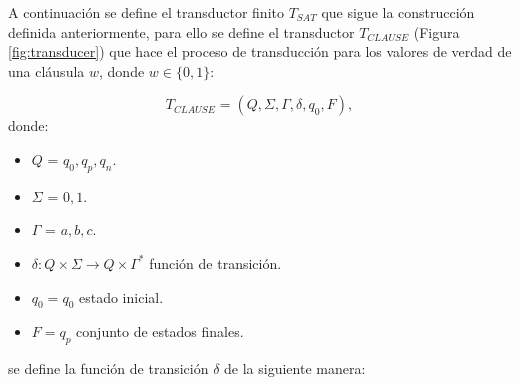\documentclass[12pt]{article}
\begin{document}
A continuación se define el transductor finito $T_{SAT}$ que sigue la construcción definida anteriormente, para ello se define
el transductor $T_{CLAUSE}$ (Figura \ref{fig:transducer}) que hace el proceso de transducción para los valores de verdad de una cláusula $w$, donde $w\in \{0,1\}$:

\[
    T_{CLAUSE} = (Q, {\Sigma}, \Gamma, \delta, q_{0}, F),
\]
donde:
\begin{itemize}
    \item \(Q\) = ${q_0,q_p,q_n}$.
    \item \(\Sigma\) = ${0,1}$.
    \item \(\Gamma\) = ${a,b,c}$.
    \item \(\delta: Q \times \Sigma \to Q \times \Gamma^*\) función de transición.
    \item \(q_{0} = q_0\) estado inicial.
    \item \(F={q_p}\) conjunto de estados finales.
\end{itemize}
se define la función de transición $\delta$ de la siguiente manera:
\end{document}
